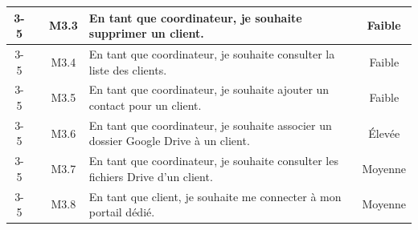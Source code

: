 \begin{longtable}{|c|c|c|p{7.2cm}|c|}
\cline{3-5}
 & & M3.3 & En tant que coordinateur, je souhaite supprimer un client. & Faible \\
\cline{3-5}
 & & M3.4 & En tant que coordinateur, je souhaite consulter la liste des clients. & Faible \\
\cline{3-5}
 & & M3.5 & En tant que coordinateur, je souhaite ajouter un contact pour un client. & Faible \\
\cline{3-5}
 & & M3.6 & En tant que coordinateur, je souhaite associer un dossier Google Drive à un client. & Élevée \\
\cline{3-5}
 & & M3.7 & En tant que coordinateur, je souhaite consulter les fichiers Drive d'un client. & Moyenne \\
\cline{3-5}
 & & M3.8 & En tant que client, je souhaite me connecter à mon portail dédié. & Moyenne \\
\hline
\end{longtable}
